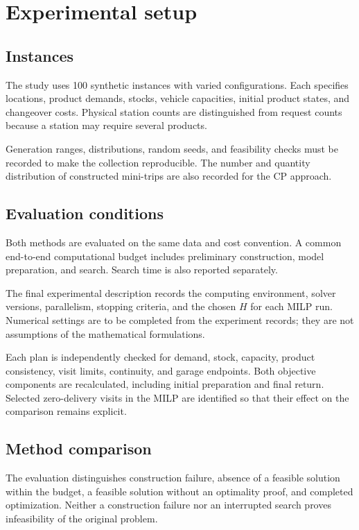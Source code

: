 \section{Experimental setup}\label{sec:experimental-setup}
\subsection{Instances}
The study uses 100 synthetic instances with varied configurations. Each specifies
locations, product demands, stocks, vehicle capacities, initial product states,
and changeover costs. Physical station counts are distinguished from request
counts because a station may require several products.

Generation ranges, distributions, random seeds, and feasibility checks must be
recorded to make the collection reproducible. The number and quantity distribution
of constructed mini-trips are also recorded for the CP approach.

\subsection{Evaluation conditions}
Both methods are evaluated on the same data and cost convention. A common
end-to-end computational budget includes preliminary construction, model
preparation, and search. Search time is also reported separately.

The final experimental description records the computing environment, solver
versions, parallelism, stopping criteria, and the chosen $H$ for each MILP run.
Numerical settings are to be completed from the experiment records; they are
not assumptions of the mathematical formulations.

Each plan is independently checked for demand, stock, capacity, product
consistency, visit limits, continuity, and garage endpoints. Both objective
components are recalculated, including initial preparation and final return.
Selected zero-delivery visits in the MILP are identified so that their effect
on the comparison remains explicit.

\subsection{Method comparison}
The evaluation distinguishes construction failure, absence of a feasible
solution within the budget, a feasible solution without an optimality proof,
and completed optimization. Neither a construction failure nor an interrupted
search proves infeasibility of the original problem.

